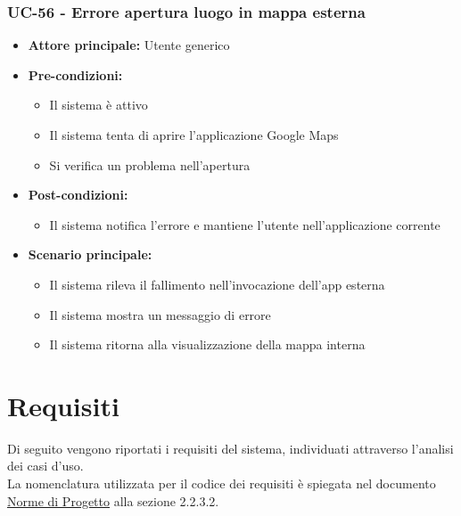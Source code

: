 \documentclass[a4paper,12pt]{article}
\begin{document}
\subsubsection{UC-56 - Errore apertura luogo in mappa esterna} \label{subsec:UC-56}
\begin{itemize}
    \item \textbf{Attore principale:} Utente generico
    \item \textbf{Pre-condizioni:}
    \begin{itemize}
        \item Il sistema è attivo
        \item Il sistema tenta di aprire l'applicazione Google Maps
        \item Si verifica un problema nell'apertura
    \end{itemize}
    \item \textbf{Post-condizioni:}
    \begin{itemize}
        \item Il sistema notifica l'errore e mantiene l'utente nell'applicazione corrente
    \end{itemize}
    \item \textbf{Scenario principale:} 
    \begin{itemize}
        \item Il sistema rileva il fallimento nell'invocazione dell'app esterna
        \item Il sistema mostra un messaggio di errore
        \item Il sistema ritorna alla visualizzazione della mappa interna
    \end{itemize}
\end{itemize}


\clearpage
\section{Requisiti} \label{section:requisiti}
Di seguito vengono riportati i requisiti del sistema, individuati attraverso l'analisi dei casi d'uso.\\
La nomenclatura utilizzata per il codice dei requisiti è spiegata nel documento \href{https://swe-bitbybit.github.io/SWE-docs/docs/documenti_interni/norme_di_progetto.pdf}{Norme di Progetto} alla sezione 2.2.3.2.\\
\end{document}
